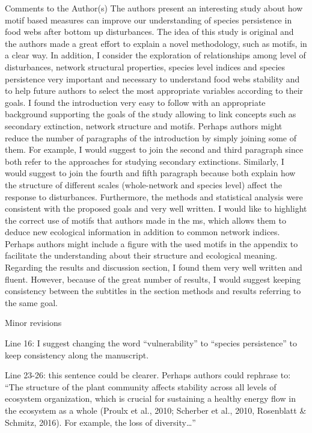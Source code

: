\documentclass[12pt]{article}
\begin{document}
Comments to the Author(s)
The authors present an interesting study about how motif based measures can improve our understanding of species persistence in food webs after bottom up disturbances. The idea of this study is original and the authors made a great effort to explain a novel methodology, such as motifs, in a clear way. In addition, I consider the exploration of relationships among level of disturbances, network structural properties, species level indices and species persistence very important and necessary to understand food webs stability and to help future authors to select the most appropriate variables according to their goals.
I found the introduction very easy to follow with an appropriate background supporting the goals of the study allowing to link concepts such as secondary extinction, network structure and motifs. Perhaps authors might reduce the number of paragraphs of the introduction by simply joining some of them. For example, I would suggest to join the second and third paragraph since both refer to the approaches for studying secondary extinctions. Similarly, I would suggest to join the fourth and fifth paragraph because both explain how the structure of different scales (whole-network and species level) affect the response to disturbances.
Furthermore, the methods and statistical analysis were consistent with the proposed goals and very well written. I would like to highlight the correct use of motifs that authors made in the ms, which allows them to deduce new ecological information in addition to common network indices. Perhaps authors might include a figure with the used motifs in the appendix to facilitate the understanding about their structure and ecological meaning. Regarding the results and discussion section, I found them very well written and fluent. However, because of the great number of results, I would suggest keeping consistency between the subtitles in the section methods and results referring to the same goal.

Minor revisions

Line 16: I suggest changing the word “vulnerability” to “species persistence” to keep consistency along the manuscript.

Line 23-26: this sentence could be clearer. Perhaps authors could rephrase to: “The structure of the plant community affects stability across all levels of ecosystem organization, which is crucial for sustaining a healthy energy flow in the ecosystem as a whole (Proulx et al., 2010; Scherber et al., 2010, Rosenblatt & Schmitz, 2016). For example, the loss of diversity…”
\end{document}
